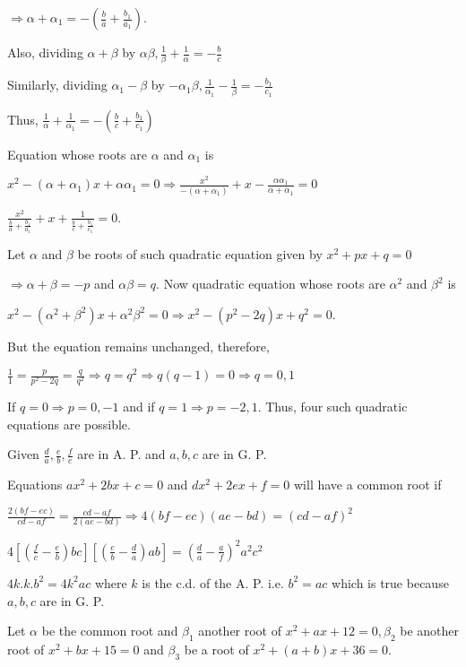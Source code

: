   $\Rightarrow \alpha + \alpha_1 = -\left(\frac{b}{a} + \frac{b_1}{a_1}\right)$.

  Also, dividing $\alpha + \beta$ by $\alpha\beta, \frac{1}{\beta} + \frac{1}{\alpha} = -\frac{b}{c}$

  Similarly, dividing $\alpha_1 - \beta$ by $-\alpha_1\beta, \frac{1}{\alpha_1} - \frac{1}{\beta} =
  -\frac{b_1}{c_1}$

  Thus, $\frac{1}{\alpha} + \frac{1}{\alpha_1} = -\left(\frac{b}{c} + \frac{b_1}{c_1}\right)$

  Equation whose roots are $\alpha$ and $\alpha_1$ is

  $x^2 - (\alpha + \alpha_1)x + \alpha\alpha_1 = 0\Rightarrow \frac{x^2}{-(\alpha + \alpha_1)} + x -
  \frac{\alpha\alpha_1}{\alpha + \alpha_1} = 0$

  $\frac{x^2}{\frac{b}{a} + \frac{b_1}{a_1}} + x + \frac{1}{\frac{b}{c} + \frac{b_1}{c_1}} = 0$.
\item Let $\alpha$ and $\beta$ be roots of such quadratic equation given by $x^2 + px + q = 0$

  $\Rightarrow \alpha + \beta = -p$ and $\alpha\beta = q$. Now quadratic equation whose roots are $\alpha^2$
  and $\beta^2$ is

  $x^2 - (\alpha^2 + \beta^2)x + \alpha^2\beta^2 = 0\Rightarrow x^2 - (p^2 - 2q)x + q^2 = 0$.

  But the equation remains unchanged, therefore,

  $\frac{1}{1} = \frac{p}{p^2 - 2q} = \frac{q}{q^2}\Rightarrow q = q^2 \Rightarrow q(q - 1) = 0 \Rightarrow
  q = 0, 1$

  If $q = 0 \Rightarrow p = 0, -1$ and if $q = 1 \Rightarrow p = -2, 1$. Thus, four such quadratic equations
  are possible.
\item Given $\frac{d}{a}, \frac{e}{b}, \frac{f}{c}$ are in A. P. and $a, b, c$ are in G. P.

  Equations $ax^2 + 2bx + c = 0$ and $dx^2 + 2ex + f = 0$ will have a common root if

  $\frac{2(bf - ec)}{cd - af} = \frac{cd - af}{2(ae - bd)}\Rightarrow 4(bf - ec)(ae - bd) = (cd - af)^2$

  $4\left[\left(\frac{f}{c} - \frac{e}{b}\right)bc\right]\left[\left(\frac{e}{b} - \frac{d}{a}\right)ab\right]
  = \left(\frac{d}{a} - \frac{a}{f}\right)^2a^2c^2$

  $4k.k.b^2 = 4k^2ac$ where $k$ is the c.d. of the A. P. i.e. $b^2 = ac$ which is true because $a, b, c$ are
  in G. P.
\item Let $\alpha$ be the common root and $\beta_1$ another root of $x^2 + ax + 12 = 0, \beta_2$ be
  another root of $x^2 + bx + 15 = 0$ and $\beta_3$ be a root of $x^2 + (a + b)x + 36 = 0$.

